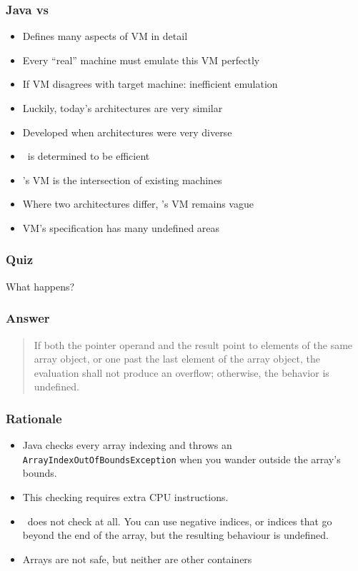 \documentclass{../ucll-slides}
\begin{document}
\begin{frame}
  \frametitle{Java vs \cpp}
  \begin{itemize}
    \item Defines many aspects of VM in detail
    \item Every ``real'' machine must emulate this VM perfectly
    \item If VM disagrees with target machine: inefficient emulation
    \item Luckily, today's architectures are very similar
  \end{itemize}
  \vskip5mm
  \structure{\cpp}
  \begin{itemize}
    \item Developed when architectures were very diverse
    \item \cpp\ is determined to be efficient
    \item \cpp's VM is the intersection of existing machines
    \item Where two architectures differ, \cpp's VM remains vague
    \item VM's specification has many undefined areas
  \end{itemize}
\end{frame}

\begin{frame}
  \frametitle{Quiz}
  \begin{center}
    {\Large What happens?}\vskip1cm
  \end{center}
\end{frame}

\begin{frame}
  \frametitle{Answer}
  \begin{quote}
    If both the pointer operand and the result point to elements of the same array object, or one past
    the last element of the array object, the evaluation shall not produce an overflow; otherwise, the behavior is
    undefined.\\
    \hfill {}
  \end{quote}
\end{frame}

\begin{frame}
  \frametitle{Rationale}
  \begin{itemize}
    \item Java checks every array indexing and throws an {\tt ArrayIndexOutOfBoundsException}
          when you wander outside the array's bounds.
    \item This checking requires extra CPU instructions.
    \item \cpp\ does not check at all. You can use negative indices, or indices that
          go beyond the end of the array, but the resulting behaviour is undefined.
    \item Arrays are not safe, but neither are other containers
  \end{itemize}
\end{frame}
\end{document}
